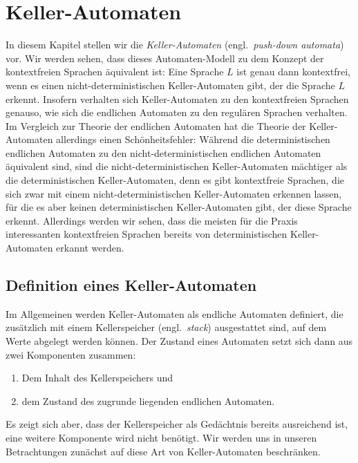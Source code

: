 \chapter{Keller-Automaten}
In diesem Kapitel stellen wir die \emph{Keller-Automaten} (engl.~\emph{push-down automata})
vor.  Wir werden sehen, dass dieses Automaten-Modell zu dem Konzept der kontextfreien Sprachen
\"aquivalent ist:  Eine Sprache $L$ ist genau dann kontextfrei, wenn es einen
nicht-deterministischen Keller-Automaten gibt, der die Sprache $L$ erkennt.  Insofern verhalten
sich Keller-Automaten zu den kontextfreien Sprachen genauso, wie sich die endlichen Automaten
zu den regul\"aren Sprachen verhalten.  Im Vergleich zur Theorie der endlichen Automaten hat die
Theorie der Keller-Automaten allerdings einen Sch\"onheitsfehler:  W\"ahrend die deterministischen
endlichen Automaten zu den nicht-deterministischen endlichen Automaten \"aquivalent sind, sind
die nicht-deterministischen Keller-Automaten m\"achtiger als die deterministischen
Keller-Automaten, denn es gibt kontextfreie Sprachen, die sich zwar mit einem
nicht-deterministischen Keller-Automaten erkennen lassen, f\"ur die es aber keinen
deterministischen Keller-Automaten gibt, der diese Sprache erkennt.  Allerdings werden wir
sehen, dass die meisten f\"ur die Praxis interessanten kontextfreien Sprachen bereits von
deterministischen Keller-Automaten erkannt werden.
    
\section{Definition eines Keller-Automaten}
Im Allgemeinen werden Keller-Automaten als endliche Automaten definiert, die zus\"atzlich mit
einem Kellerspeicher (engl.~\emph{stack}) ausgestattet sind, auf dem Werte abgelegt werden k\"onnen.  Der
Zustand eines Automaten setzt sich dann aus zwei Komponenten zusammen:
\begin{enumerate}
\item Dem Inhalt des Kellerspeichers und
\item dem Zustand des zugrunde liegenden endlichen Automaten.
\end{enumerate}
Es zeigt sich aber, dass der Kellerspeicher als Ged\"achtnis bereits ausreichend ist, eine weitere
Komponente wird nicht ben\"otigt.  Wir werden uns in unseren Betrachtungen zun\"achst auf diese Art von
Keller-Automaten beschr\"anken.

